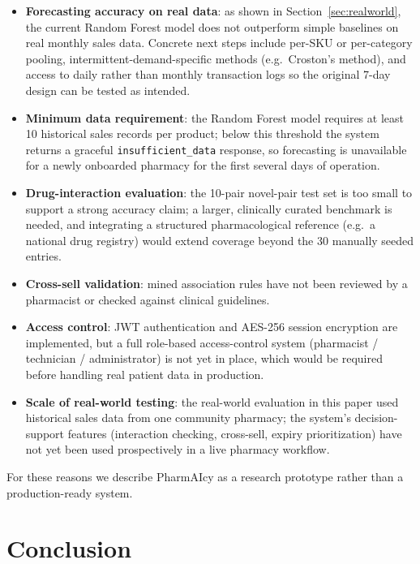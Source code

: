 \documentclass[12pt,a4paper]{article}
\begin{document}
\begin{itemize}[leftmargin=*]
    \item \textbf{Forecasting accuracy on real data}: as shown in Section~\ref{sec:realworld}, the current Random Forest model does not outperform simple baselines on real monthly sales data. Concrete next steps include per-SKU or per-category pooling, intermittent-demand-specific methods (e.g.\ Croston's method), and access to daily rather than monthly transaction logs so the original 7-day design can be tested as intended.
    \item \textbf{Minimum data requirement}: the Random Forest model requires at least 10 historical sales records per product; below this threshold the system returns a graceful \texttt{insufficient\_data} response, so forecasting is unavailable for a newly onboarded pharmacy for the first several days of operation.
    \item \textbf{Drug-interaction evaluation}: the 10-pair novel-pair test set is too small to support a strong accuracy claim; a larger, clinically curated benchmark is needed, and integrating a structured pharmacological reference (e.g.\ a national drug registry) would extend coverage beyond the 30 manually seeded entries.
    \item \textbf{Cross-sell validation}: mined association rules have not been reviewed by a pharmacist or checked against clinical guidelines.
    \item \textbf{Access control}: JWT authentication and AES-256 session encryption are implemented, but a full role-based access-control system (pharmacist / technician / administrator) is not yet in place, which would be required before handling real patient data in production.
    \item \textbf{Scale of real-world testing}: the real-world evaluation in this paper used historical sales data from one community pharmacy; the system's decision-support features (interaction checking, cross-sell, expiry prioritization) have not yet been used prospectively in a live pharmacy workflow.
\end{itemize}

For these reasons we describe PharmAIcy as a research prototype rather than a production-ready system.

\section{Conclusion}
\label{sec:conclusion}
\end{document}
